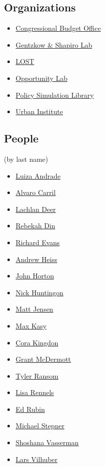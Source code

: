 \documentclass[]{book}
\providecommand{\tightlist}{%
  \setlength{\itemsep}{0pt}\setlength{\parskip}{0pt}}
\begin{document}
\hypertarget{organizations}{%
\subsection{Organizations}\label{organizations}}

\begin{itemize}
\tightlist
\item
  \href{https://github.com/US-CBO}{Congressional Budget Office}
\item
  \href{https://github.com/gslab-econ}{Gentzkow \& Shapiro Lab}
\item
  \href{https://lost-stats.github.io/}{LOST}
\item
  \href{https://github.com/Opportunitylab}{Opportunity Lab}
\item
  \href{https://github.com/PSLmodels}{Policy Simulation Library}
\item
  \href{https://github.com/UrbanInstitute}{Urban Institute}
\end{itemize}

\hypertarget{people}{%
\subsection{People}\label{people}}

(by last name)

\begin{itemize}
\tightlist
\item
  \href{https://github.com/luizaandrade}{Luiza Andrade}
\item
  \href{https://github.com/acarril}{Alvaro Carril}
\item
  \href{https://github.com/lachlandeer}{Lachlan Deer}
\item
  \href{https://github.com/rebekahanne}{Rebekah Din}
\item
  \href{https://github.com/rickecon}{Richard Evans}
\item
  \href{https://github.com/andrewheiss}{Andrew Heiss}
\item
  \href{https://github.com/johnjosephhorton}{John Horton}
\item
  \href{https://github.com/NickCH-K}{Nick Huntingon}
\item
  \href{https://github.com/MattHJensen}{Matt Jensen}
\item
  \href{https://github.com/maxkasy}{Max Kasy}
\item
  \href{https://github.com/ckingdon95}{Cora Kingdon}
\item
  \href{https://github.com/grantmcdermott}{Grant McDermott}
\item
  \href{https://github.com/tyleransom}{Tyler Ransom}
\item
  \href{https://github.com/lrennels}{Lisa Rennels}
\item
  \href{https://github.com/edrubin}{Ed Rubin}
\item
  \href{https://github.com/michaelstepner}{Michael Stepner}
\item
  \href{https://github.com/shoshievass}{Shoshana Vasserman}\\
\item
  \href{https://github.com/larsvilhuber}{Lars Vilhuber}
\end{itemize}
\end{document}
